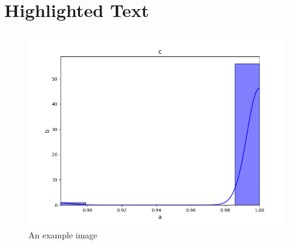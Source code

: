 \documentclass{article}
\begin{document}
\section{Highlighted Text}

\begin{figure}[H]
\centering
\includegraphics[width=1\textwidth]{ elements/plot1.png }
\caption{An example image}
\end{figure}
\end{document}
